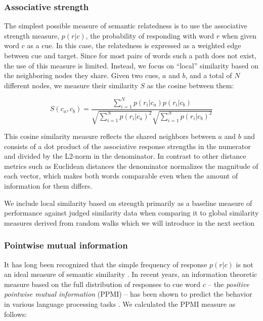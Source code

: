 \documentclass[a4paper,doc,natbib,floatsintext]{apa6}
\begin{document}
\subsubsection{Associative strength}

The simplest possible measure of semantic relatedness is to use the associative strength measure, $p(r|c)$, the probability of responding with word $r$ when given word $c$ as a cue. In this case, the relatedness is expressed as a weighted edge between cue and target. Since for most pairs of words such a path does not exist, the use of this measure is limited. Instead, we focus on ``local'' similarity based on the neighboring nodes they share. Given two cues, $a$ and $b$, and a total of $N$ different nodes, we measure their similarity $S$ as the cosine between them:

\begin{equation}
S(c_a,c_b) = \frac{\sum_{i=1}^N p(r_i|c_a) p(r_i|c_b)}
{\sqrt{\sum_{i=1}^N p(r_i|c_a)^2}\sqrt{\sum_{i=1}^N p(r_i|c_b)^2}}
\end{equation}

This cosine similarity measure reflects the shared neighbors between $a$ and $b$ and consists of a dot product of the associative response strengths in the numerator and divided by the L2-norm in the denominator. In contrast to other distance metrics such as Euclidean distances the denominator normalizes the magnitude of each vector, which makes both words comparable even when the amount of information for them differs.

We include local similarity based on strength primarily as a baseline measure of performance against judged similarity data when comparing it to global similarity measures derived from random walks which we will introduce in the next section

\subsubsection{Pointwise mutual information}

It has long been recognized that the simple frequency of response $p(r|c)$ is not an ideal measure of semantic similarity \cite[see p 10,][]{Deese1965}.  In recent years, an information theoretic measure based on the full distribution of responses to cue word $c$ -- the {\it positive pointwise mutual information} (PPMI) -- has been shown to predict the behavior in various language processing tasks \cite[e.g.,][]{Recchia2009}. We calculated the PPMI measure as follows:
\end{document}
